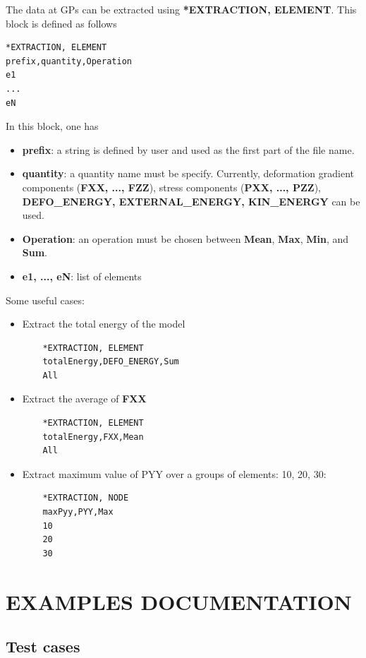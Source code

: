 \documentclass[oneside,11pt,times]{book}
\begin{document}
The data at GPs can be extracted using \textbf{*EXTRACTION, ELEMENT}. This block is defined as follows
\begin{lstlisting}
*EXTRACTION, ELEMENT
prefix,quantity,Operation
e1
...
eN
\end{lstlisting}
In this block, one has
\begin{itemize}
	\item \textbf{prefix}: a string is defined by user and used as the first part of the file name.
	\item \textbf{quantity}: a quantity name must be specify. Currently, deformation gradient components (\textbf{FXX, ..., FZZ}), stress components (\textbf{PXX, ..., PZZ}), \textbf{DEFO\_ENERGY, EXTERNAL\_ENERGY, KIN\_ENERGY} can be used.
	\item \textbf{Operation}: an operation must be chosen between \textbf{Mean}, \textbf{Max}, \textbf{Min}, and \textbf{Sum}.
	\item \textbf{e1, ..., eN}: list of elements
\end{itemize}
Some useful cases:
\begin{itemize}
	\item Extract the total energy of the model
	\begin{lstlisting}
	*EXTRACTION, ELEMENT
	totalEnergy,DEFO_ENERGY,Sum
	All
	\end{lstlisting}
	\item Extract the average of \textbf{FXX}
	\begin{lstlisting}
	*EXTRACTION, ELEMENT
	totalEnergy,FXX,Mean
	All
	\end{lstlisting}
	\item Extract maximum value of PYY over a groups of elements: 10, 20, 30:
	\begin{lstlisting}
	*EXTRACTION, NODE
	maxPyy,PYY,Max
	10
	20
	30
	\end{lstlisting}
\end{itemize}


\chapter{EXAMPLES DOCUMENTATION} \label{Chapter:examples}

\section{Test cases}
\end{document}
